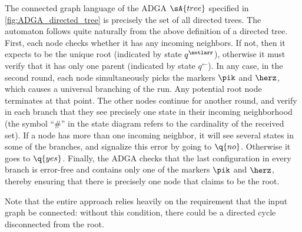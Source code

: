 \documentclass[a4paper,11pt,twoside]{report} \pdfoutput=1
\begin{document}
\begin{example}
  The connected graph language of the ADGA $\sA{tree}$ specified in
  \cref{fig:ADGA_directed_tree} is precisely the set of all directed
  trees. The automaton follows quite naturally from the above
  definition of a directed tree. First, each node checks whether it
  has any incoming neighbors. If not, then it expects to be the
  unique root (indicated by state $q^\notlarr$), otherwise it must
  verify that it has only one parent (indicated by state $q^←$). In
  any case, in the second round, each node simultaneously picks the
  markers $\pik$ and $\herz$, which causes a universal branching of
  the run. Any potential root node terminates at that point. The other
  nodes continue for another round, and verify in each branch that
  they see precisely one state in their incoming neighborhood (the
  symbol “$\#$” in the state diagram refers to the cardinality of the
  received set). If a node has more than one incoming neighbor, it
  will see several states in some of the branches, and signalize this
  error by going to $\q{no}$. Otherwise it goes to $\q{yes}$. Finally,
  the ADGA checks that the last configuration in every branch is
  error-free and contains only one of the markers $\pik$ and $\herz$,
  thereby ensuring that there is precisely one node that claims to be
  the root.

  Note that the entire approach relies heavily on the requirement that
  the input graph be connected: without this condition, there could be
  a directed cycle disconnected from the root.
\end{example}
\end{document}
